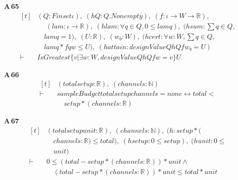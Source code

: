 \noindent\textbf{A\,65}\quad{}
{\footnotesize\[ \begin{aligned}[t]
&(\mathit{Q} : \mathit{Finset} \iota ),\; (\mathit{hQ} : \mathit{Q}.\mathit{Nonempty}),\; (\mathit{f} : \iota \to \mathit{W} \to \mathbb{R} ),\\
&\quad \; (\mathit{lam} : \iota \to \mathbb{R} ),\; (\mathit{hlam} : \forall \mathit{q} \in \mathit{Q}, 0 \leq \mathit{lam} \mathit{q}),\; (\mathit{hsum} : \textstyle\sum \mathit{q} \in \mathit{Q},\\
&\quad \mathit{lam} \mathit{q} = 1),\; (\mathit{U} : \mathbb{R} ),\; (\mathit{w₀} : \mathit{W}),\; (\mathit{hcert} : \forall \mathit{w} : \mathit{W}, \textstyle\sum \mathit{q} \in \mathit{Q},\\
&\quad \mathit{lam} \mathit{q} * \mathit{f} \mathit{q} \mathit{w} \leq \mathit{U}),\; (\mathit{hattain} : \mathit{designValue} \mathit{Q} \mathit{hQ} \mathit{f} \mathit{w₀} = \mathit{U})\\
\vdash\;&\mathit{IsGreatest} \{ \mathit{v} | \exists \mathit{w} : \mathit{W}, \mathit{designValue} \mathit{Q} \mathit{hQ} \mathit{f} \mathit{w} = \mathit{v}\} \mathit{U}
\end{aligned} \]}

\noindent\textbf{A\,66}\quad{}
{\footnotesize\[ \begin{aligned}[t]
&(\mathit{total} \mathit{setup} : \mathbb{R} ),\; (\mathit{channels} : \mathbb{N} )\\
\vdash\;&\mathit{sampleBudget} \mathit{total} \mathit{setup} \mathit{channels} = \mathit{none} \leftrightarrow \mathit{total} <\\
&\quad \mathit{setup} * (\mathit{channels} : \mathbb{R} )
\end{aligned} \]}

\noindent\textbf{A\,67}\quad{}
{\footnotesize\[ \begin{aligned}[t]
&(\mathit{total} \mathit{setup} \mathit{unit} : \mathbb{R} ),\; (\mathit{channels} : \mathbb{N} ),\; (\mathit{h} : \mathit{setup} * (\\
&\quad \mathit{channels} : \mathbb{R} ) \leq \mathit{total}),\; (\mathit{hsetup} : 0 \leq \mathit{setup}),\; (\mathit{hunit} : 0 \leq\\
&\quad \mathit{unit})\\
\vdash\;&0 \leq (\mathit{total} - \mathit{setup} * (\mathit{channels} : \mathbb{R} )) * \mathit{unit} \wedge\\
&\quad (\mathit{total} - \mathit{setup} * (\mathit{channels} : \mathbb{R} )) * \mathit{unit} \leq \mathit{total} * \mathit{unit}
\end{aligned} \]}

